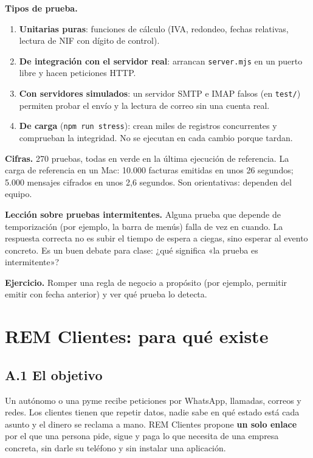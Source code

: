 \textbf{Tipos de prueba.}

\begin{enumerate}
\def\labelenumi{\arabic{enumi}.}
\tightlist
\item
  \textbf{Unitarias puras}: funciones de cálculo (IVA, redondeo, fechas relativas, lectura de NIF con dígito de control).
\item
  \textbf{De integración con el servidor real}: arrancan \texttt{server.mjs} en un puerto libre y hacen peticiones HTTP.
\item
  \textbf{Con servidores simulados}: un servidor SMTP e IMAP falsos (en \texttt{test/}) permiten probar el envío y la lectura de correo sin una cuenta real.
\item
  \textbf{De carga} (\texttt{npm\ run\ stress}): crean miles de registros concurrentes y comprueban la integridad. No se ejecutan en cada cambio porque tardan.
\end{enumerate}

\textbf{Cifras.} 270 pruebas, todas en verde en la última ejecución de referencia. La carga de referencia en un Mac: 10.000 facturas emitidas en unos 26 segundos; 5.000 mensajes cifrados en unos 2,6 segundos. Son orientativas: dependen del equipo.

\textbf{Lección sobre pruebas intermitentes.} Alguna prueba que depende de temporización (por ejemplo, la barra de menús) falla de vez en cuando. La respuesta correcta no es subir el tiempo de espera a ciegas, sino esperar al evento concreto. Es un buen debate para clase: ¿qué significa «la prueba es intermitente»?

\textbf{Ejercicio.} Romper una regla de negocio a propósito (por ejemplo, permitir emitir con fecha anterior) y ver qué prueba lo detecta.

\chapter{REM Clientes: para qué existe}\label{rem-clientes-para-quuxe9-existe}

\section{A.1 El objetivo}\label{a.1-el-objetivo}

Un autónomo o una pyme recibe peticiones por WhatsApp, llamadas, correos y redes. Los clientes tienen que repetir datos, nadie sabe en qué estado está cada asunto y el dinero se reclama a mano. REM Clientes propone \textbf{un solo enlace} por el que una persona pide, sigue y paga lo que necesita de una empresa concreta, sin darle su teléfono y sin instalar una aplicación.


